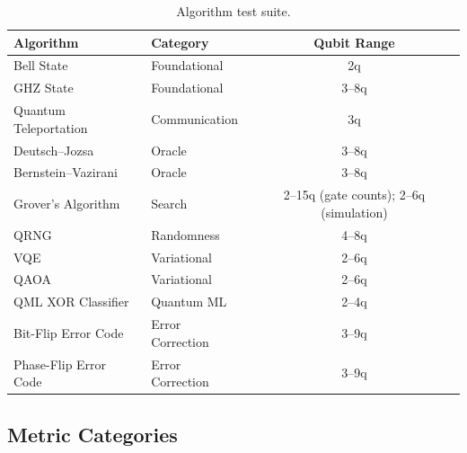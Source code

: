 \begin{table}[t]
\caption{Algorithm test suite.}
\label{tab:algorithms}
\centering
\begin{tabular}{llc}
\toprule
\textbf{Algorithm}       & \textbf{Category}    & \textbf{Qubit Range} \\
\midrule
Bell State               & Foundational         & 2q \\
GHZ State                & Foundational         & 3--8q \\
Quantum Teleportation    & Communication        & 3q \\
Deutsch--Jozsa           & Oracle               & 3--8q \\
Bernstein--Vazirani      & Oracle               & 3--8q \\
Grover's Algorithm       & Search               & 2--15q (gate counts); 2--6q (simulation) \\
QRNG                     & Randomness           & 4--8q \\
VQE                      & Variational          & 2--6q \\
QAOA                     & Variational          & 2--6q \\
QML XOR Classifier       & Quantum ML           & 2--4q \\
Bit-Flip Error Code      & Error Correction     & 3--9q \\
Phase-Flip Error Code    & Error Correction     & 3--9q \\
\bottomrule
\end{tabular}
\end{table}

\subsection{Metric Categories}

